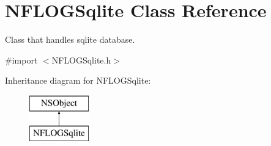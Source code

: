 \hypertarget{interface_n_f_l_o_g_sqlite}{}\section{N\+F\+L\+O\+G\+Sqlite Class Reference}
\label{interface_n_f_l_o_g_sqlite}


Class that handles sqlite database.  




{\ttfamily \#import $<$N\+F\+L\+O\+G\+Sqlite.\+h$>$}

Inheritance diagram for N\+F\+L\+O\+G\+Sqlite\+:\begin{figure}[H]
\begin{center}
\leavevmode
\includegraphics[height=2.000000cm]{interface_n_f_l_o_g_sqlite}
\end{center}
\end{figure}
